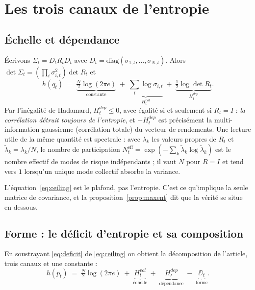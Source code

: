 \section{Les trois canaux de l'entropie}
\label{sec:channels}

\subsection{Échelle et dépendance}

Écrivons $\Sigma_t = D_tR_tD_t$ avec
$D_t=\mathrm{diag}(\sigma_{1,t},\dots,\sigma_{N,t})$. Alors
$\det\Sigma_t = \left(\prod_i\sigma_{i,t}^2\right)\det R_t$ et
\begin{equation}
\label{eq:ceiling}
h(q_t) \;=\; \underbrace{\tfrac{N}{2}\log(2\pi e)}_{\text{constante}}
\;+\; \underbrace{\sum_i \log\sigma_{i,t}}_{H^{vol}_t}
\;+\; \underbrace{\tfrac12\log\det R_t}_{H^{dep}_t}.
\end{equation}
Par l'inégalité de Hadamard, $H^{dep}_t\le 0$, avec égalité si et seulement si
$R_t=I$ : \emph{la corrélation détruit toujours de l'entropie}, et $-H^{dep}_t$
est précisément la multi-information gaussienne (corrélation totale) du vecteur
de rendements. Une lecture utile de la même quantité est spectrale : avec
$\lambda_k$ les valeurs propres de $R_t$ et $\tilde\lambda_k=\lambda_k/N$, le
nombre de participation
$N^{\text{eff}}_t=\exp\!\left(-\sum_k\tilde\lambda_k\log\tilde\lambda_k\right)$
est le nombre effectif de modes de risque indépendants ; il vaut $N$ pour $R=I$
et tend vers $1$ lorsqu'un unique mode collectif absorbe la variance.

L'équation~\eqref{eq:ceiling} est le plafond, pas l'entropie. C'est ce
qu'implique la seule matrice de covariance, et la proposition~\ref{prop:maxent}
dit que la vérité se situe en dessous.

\subsection{Forme : le déficit d'entropie et sa composition}

En soustrayant \eqref{eq:deficit} de \eqref{eq:ceiling} on obtient la
décomposition de l'article, trois canaux et une constante :
\begin{equation}
\label{eq:three}
h(p_t) \;=\; \tfrac{N}{2}\log(2\pi e) \;+\; \underbrace{H^{vol}_t}_{\text{échelle}} \;+\; \underbrace{H^{dep}_t}_{\text{dépendance}} \;-\; \underbrace{\DD_t}_{\text{forme}}.
\end{equation}


